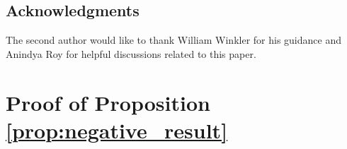 \documentclass[11pt]{article}
\begin{document}
\subsection*{Acknowledgments}

The second author would like to thank William Winkler for his guidance and Anindya Roy for helpful discussions related to this paper.         


















 


{

}
\appendix
\section{Proof of Proposition \ref{prop:negative_result}}
\end{document}
